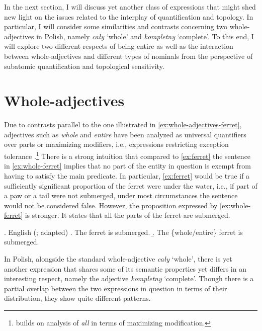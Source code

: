 In the next section, I will discuss yet another class of expressions that might shed new light on the issues related to the interplay of quantification and topology. In particular, I will consider some similarities and contrasts concerning two whole-adjectives in Polish, namely \textit{cały} `whole' and \textit{kompletny} `complete'. To this end, I will explore two different respects of being entire as well as the interaction between whole-adjectives and different types of nominals from the perspective of subatomic quantification and topological sensitivity.

\section{Whole-adjectives}\label{sec:whole-adjectives}

Due to contrasts parallel to the one illustrated in \ref{ex:whole-adjectives-ferret}, adjectives such as \textit{whole} and \textit{entire} have been analyzed as universal quantifiers over parts \citep{moltmann1997parts} or maximizing modifiers, i.e., expressions restricting exception tolerance \citep{morzycki2002wholes}.\footnote{\citet{morzycki2002wholes} builds on  analysis of \textit{all} in terms of maximizing modification.} There is a strong intuition that compared to \ref{ex:ferret} the sentence in \ref{ex:whole-ferret} implies that no part of the entity in question is exempt from having to satisfy the main predicate. In particular, \ref{ex:ferret} would be true if a sufficiently significant proportion of the ferret were under the water, i.e., if part of a paw or a tail were not submerged, under most circumstances the sentence would not be considered false. However, the proposition expressed by \ref{ex:whole-ferret} is stronger. It states that all the parts of the ferret are submerged.

\ex. English (\citealt{morzycki2002wholes}; adapted)\label{ex:whole-adjectives-ferret}
\a. The ferret is submerged.\label{ex:ferret}
\b. The \{whole/entire\} ferret is submerged.\label{ex:whole-ferret}

In Polish, alongside the standard whole-adjective \textit{cały} `whole', there is yet another expression that shares some of its semantic properties yet differs in an interesting respect, namely the adjective \textit{kompletny} `complete'. Though there is a partial overlap between the two expressions in question in terms of their distribution, they show quite different patterns. 

